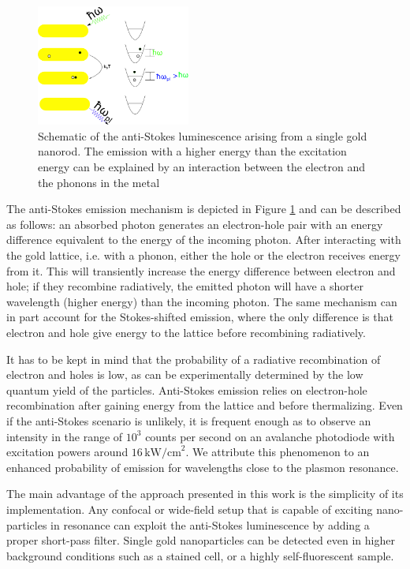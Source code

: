 \documentclass[journal=nalefd,manuscript=letter]{achemso}
\newcommand{\pwr}{\ensuremath{\,\textrm{kW/cm}^2}}
\begin{document}
\begin{figure}[htp]
\centering
	\includegraphics[width=0.45\textwidth]{Figures/01_Scheme/luminescence_all_AS.png}
	\caption{Schematic of the anti-Stokes luminescence arising from a single gold
	nanorod. The emission with a higher energy than the excitation energy can be
	explained by an interaction between the electron and the phonons in the metal}
	\label{fig:anti-Stokes-process}
\end{figure}

The anti-Stokes emission mechanism\cite{He2015} is depicted in Figure
\ref{fig:anti-Stokes-process} and can be described as follows: an absorbed
photon generates an electron-hole pair with an energy difference equivalent to
the energy of the incoming photon. After interacting with the gold lattice, i.e.
with a phonon\cite{Lin2008}, either the hole or the electron receives energy
from it. This will transiently increase the energy difference between electron
and hole; if they recombine radiatively, the emitted photon will have a shorter
wavelength (higher energy) than the incoming photon\cite{Huang2014}. The same
mechanism can in part account for the Stokes-shifted emission, where the only
difference is that electron and hole give energy to the lattice before
recombining radiatively.

It has to be kept in mind that the probability of a radiative recombination of
electron and holes is low, as can be experimentally determined by the low
quantum yield of the particles. Anti-Stokes emission relies on electron-hole
recombination after gaining energy from the lattice and before thermalizing.
Even if the anti-Stokes scenario is unlikely, it is frequent enough as to
observe an intensity in the range of $10^3$ counts per second on an avalanche
photodiode with excitation powers around $16\pwr$. We attribute this phenomenon
to an enhanced probability of emission for wavelengths close to the plasmon
resonance\cite{Neupane2013}.

The main advantage of the approach presented in this work is the simplicity of
its implementation. Any confocal or wide-field setup that is capable of exciting
nano-particles in resonance can exploit the anti-Stokes luminescence by adding a
proper short-pass filter. Single gold nanoparticles can be detected even in
higher background conditions such as a stained cell, or a highly
self-fluorescent sample.
\end{document}
